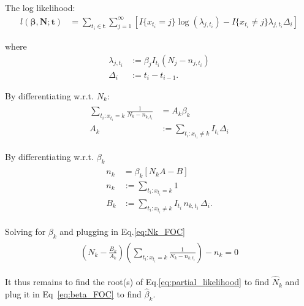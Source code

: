 \documentclass[12pt,a4paper,draft]{article}
\begin{document}
The log likelihood:
\begin{align*}
	l(\bm{\beta},\bm{N}; \bm{t}) &=
	\sum_{t_i \in \bm t} \sum_{j=1}^\infty \left[
		I\{ x_{t_i} = j \} \log(\lambda_{j,t_i}) -
		I\{ x_{t_i} \neq j  \} \lambda_{j,t_i} \Delta_i
	\right]	
\end{align*}

where 
\begin{align*}
	\lambda_{j,t_i} &:= \beta_j I_{t_i} (N_j-n_{j,t_i}) \\
	\Delta_i &:= t_i - t_{i-1}. 
\end{align*}

By differentiating w.r.t. $N_k$:
\begin{align}\label{eq:Nk_FOC}
\begin{split}
	\sum_{t_i:x_{t_i}=k} \frac{1}{N_k - n_{k,t_i}} &= A_k \beta_k \\
	A_k &:= \sum_{t_i: x_{t_i} \neq k} I_{t_i} \Delta_i
\end{split}
\end{align}

By differentiating w.r.t. $\beta_k$
\begin{align}\label{eq:beta_FOC}
\begin{split}
	n_k &= \beta_k [ N_k A- B ] \\
	n_k &:= \sum_{t_i:x_{t_i}=k} 1 \\
	B_k &:= \sum_{t_i: x_{t_i} \neq k} I_{t_i} \, n_{k,t_i} \, \Delta_i.
\end{split}
\end{align}

Solving for $\beta_k$ and plugging in Eq.\ref{eq:Nk_FOC}
\begin{align}\label{eq:partial_likelihood}
\begin{split}
	\left( N_k-\frac{B_k}{A_k} \right) 
	\left( \sum_{t_i:x_{t_i}=k}\frac{1}{N_k - n_{k,t_i}}\right) - n_{k}=0
\end{split}
\end{align}

It thus remains to find the root(s) of Eq.\ref{eq:partial_likelihood} to find $\hat{N}_k$ and plug it in Eq~\ref{eq:beta_FOC} to find $\hat{\beta}_k$.
\end{document}
